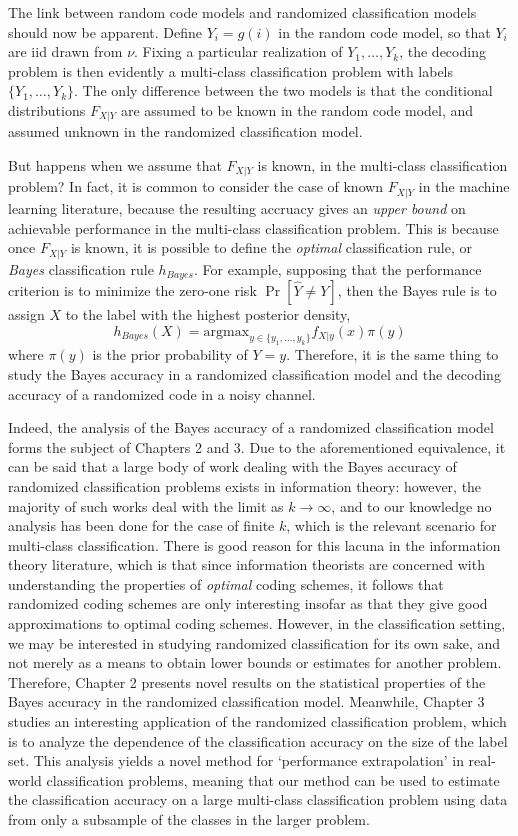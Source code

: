 The link between random code models and randomized classification
models should now be apparent. Define $Y_i = g(i)$ in the random code
model, so that $Y_i$ are iid drawn from $\nu$.  Fixing a particular
realization of $Y_1,\hdots, Y_k$, the decoding problem is then
evidently a multi-class classification problem with labels
$\{Y_1,\hdots, Y_k\}$.  The only difference between the two models is
that the conditional distributions $F_{X|Y}$ are assumed to be known
in the random code model, and assumed unknown in the randomized
classification model.

But happens when we assume that $F_{X|Y}$ is known, in the multi-class
classification problem?  In fact, it is common to consider the case of
known $F_{X|Y}$ in the machine learning literature, because the
resulting accruacy gives an \emph{upper bound} on achievable
performance in the multi-class classification problem.  This is
because once $F_{X|Y}$ is known, it is possible to define the
\emph{optimal} classification rule, or \emph{Bayes} classification
rule $h_{Bayes}$.  For example, supposing that the performance
criterion is to minimize the zero-one risk $\Pr[\hat{Y} \neq Y]$, then
the Bayes rule is to assign $X$ to the label with the highest
posterior density,
\[
h_{Bayes}(X) = \text{argmax}_{y \in \{y_1, \hdots, y_k\}} f_{X|y}(x) \pi(y)
\]
where $\pi(y)$ is the prior probability of $Y = y$.  Therefore, it is
the same thing to study the Bayes accuracy in a randomized
classification model and the decoding accuracy of a randomized code in
a noisy channel.

Indeed, the analysis of the Bayes accuracy of a randomized
classification model forms the subject of Chapters 2 and 3.  Due to
the aforementioned equivalence, it can be said that a large body of
work dealing with the Bayes accuracy of randomized classification
problems exists in information theory: however, the majority of such
works deal with the limit as $k \to \infty$, and to our knowledge no
analysis has been done for the case of finite $k$, which is the
relevant scenario for multi-class classification.  There is good
reason for this lacuna in the information theory literature, which is
that since information theorists are concerned with understanding the
properties of \emph{optimal} coding schemes, it follows that
randomized coding schemes are only interesting insofar as that they
give good approximations to optimal coding schemes.  However, in the
classification setting, we may be interested in studying randomized
classification for its own sake, and not merely as a means to obtain
lower bounds or estimates for another problem.  Therefore, Chapter 2
presents novel results on the statistical properties of the Bayes
accuracy in the randomized classification model.  Meanwhile, Chapter 3
studies an interesting application of the randomized classification
problem, which is to analyze the dependence of the classification
accuracy on the size of the label set.  This analysis yields a novel
method for `performance extrapolation' in real-world classification
problems, meaning that our method can be used to estimate the
classification accuracy on a large multi-class classification problem
using data from only a subsample of the classes in the larger problem.

